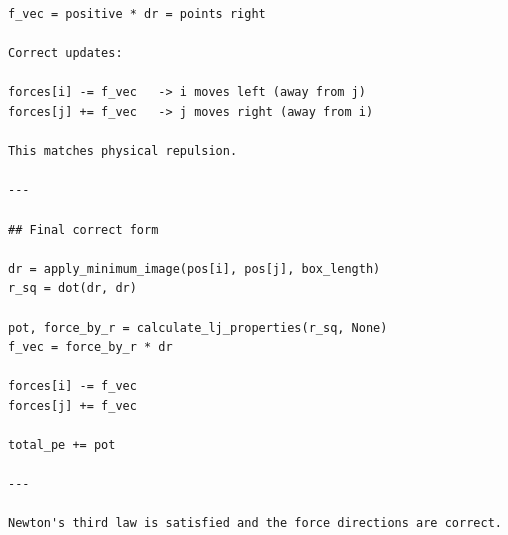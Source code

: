 \begin{lstlisting}
f_vec = positive * dr = points right

Correct updates:

forces[i] -= f_vec   -> i moves left (away from j)
forces[j] += f_vec   -> j moves right (away from i)

This matches physical repulsion.

---

## Final correct form

dr = apply_minimum_image(pos[i], pos[j], box_length)
r_sq = dot(dr, dr)

pot, force_by_r = calculate_lj_properties(r_sq, None)
f_vec = force_by_r * dr

forces[i] -= f_vec
forces[j] += f_vec

total_pe += pot

---

Newton's third law is satisfied and the force directions are correct.
\end{lstlisting}

